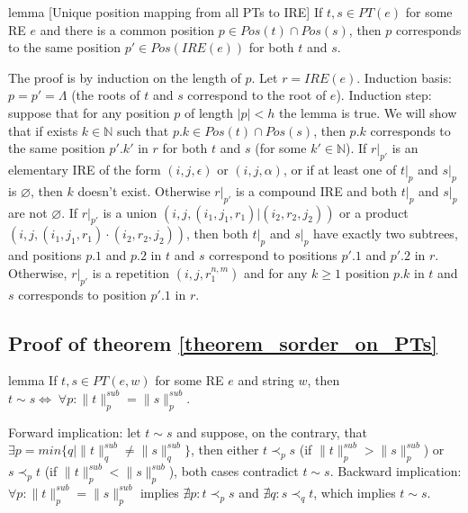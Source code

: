 \documentclass[AMA,STIX1COL]{WileyNJD-v2}
\newcommand{\YN}{\mathbb{N}}
\newcommand{\IRE}{I\!RE}
\newcommand{\snorm}[2]{\|{#1}\|^{sub}_{#2}}
\begin{document}
\begin{theoremEnd}{lemma}
[Unique position mapping from all PTs to IRE]
    \label{lemma_positions}
    If $t, s \in PT(e)$ for some RE $e$
    and there is a common position $p \in Pos(t) \cap Pos(s)$,
    then $p$ corresponds to the same position $p' \in Pos(\IRE(e))$ for both $t$ and $s$.
\end{theoremEnd}
\begin{proofEnd}
    The proof is by induction on the length of $p$.
    Let $r = \IRE(e)$.
    Induction basis: $p = p' = \Lambda$ (the roots of $t$ and $s$ correspond to the root of $e$).
    Induction step: suppose that for any position $p$ of length $|p| < h$ the lemma is true.
    We will show that if exists $k \in \YN$ such that $p.k \in Pos(t) \cap Pos(s)$,
    then $p.k$ corresponds to the same position $p'.k'$ in $r$ for both $t$ and $s$ (for some $k' \in \YN$).
    If $r|_{p'}$ is an elementary IRE of the form $(i, j, \epsilon)$ or $(i, j, \alpha)$,
    or if at least one of $t|_p$ and $s|_p$ is $\varnothing$,
    then $k$ doesn't exist.
    Otherwise $r|_{p'}$ is a compound IRE and both $t|_p$ and $s|_p$ are not $\varnothing$.
    If $r|_{p'}$ is a union $(i, j, (i_1, j_1, r_1)|(i_2, r_2, j_2))$
    or a product $(i, j, (i_1, j_1, r_1)\cdot(i_2, r_2, j_2))$,
    then both $t|_p$ and $s|_p$ have exactly two subtrees,
    and positions $p.1$ and $p.2$ in $t$ and $s$ correspond to positions $p'.1$ and $p'.2$ in $r$.
    Otherwise, $r|_{p'}$ is a repetition $(i, j, r_1^{n,m})$
    and for any $k \geq 1$ position $p.k$ in $t$ and $s$ corresponds to position $p'.1$ in $r$.
\end{proofEnd}



\subsection*{Proof of theorem \ref{theorem_sorder_on_PTs}}

\begin{theoremEnd}{lemma}
    \label{lemma_incomparability_equivdef}
    If $t, s \in PT(e, w)$ for some RE $e$ and string $w$,
    then $t \sim s \Leftrightarrow \; \forall p : \snorm{t}{p} = \snorm{s}{p}$.
\end{theoremEnd}
\begin{proofEnd}
    Forward implication: let $t \sim s$ and suppose, on the contrary, that $\exists p = min \{ q \mid \snorm{t}{q} \neq \snorm{s}{q} \}$,
    then either $t \prec_p s$ (if $\snorm{t}{p} > \snorm{s}{p}$) or $s \prec_p t$ (if $\snorm{t}{p} < \snorm{s}{p}$),
    both cases contradict $t \sim s$.
    Backward implication: $\forall p : \snorm{t}{p} = \snorm{s}{p}$
    implies $\nexists p : t \prec_p s$ and $\nexists q : s \prec_q t$,
    which implies $t \sim s$.
    \\[0.5em]
\end{proofEnd}
\end{document}
